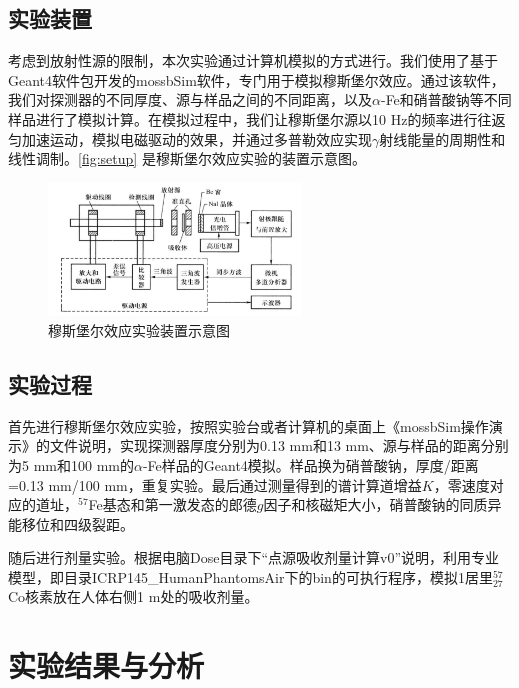 \documentclass[font=default]{mpltx}
\begin{document}
\subsection{实验装置}
考虑到放射性源的限制，本次实验通过计算机模拟的方式进行。我们使用了基于Geant4软件包开发的mossbSim软件，专门用于模拟穆斯堡尔效应。通过该软件，我们对探测器的不同厚度、源与样品之间的不同距离，以及$\alpha$-Fe和硝普酸钠等不同样品进行了模拟计算。在模拟过程中，我们让穆斯堡尔源以10 Hz的频率进行往返匀加速运动，模拟电磁驱动的效果，并通过多普勒效应实现$\gamma$射线能量的周期性和线性调制。\autoref{fig:setup} 是穆斯堡尔效应实验的装置示意图。
\begin{figure}
  \centering
  \includegraphics[width=0.6\textwidth]{fig/setup.png}
  \caption{穆斯堡尔效应实验装置示意图}
  \label{fig:setup}
\end{figure}
\subsection{实验过程}
首先进行穆斯堡尔效应实验，按照实验台或者计算机的桌面上《mossbSim操作演示》的文件说明，实现探测器厚度分别为0.13 mm和13 mm、源与样品的距离分别为5 mm和100 mm的$\alpha$-Fe样品的Geant4模拟。样品换为硝普酸钠，厚度/距离=0.13 mm/100 mm，重复实验。最后通过测量得到的谱计算道增益$K$，零速度对应的道址，$^{57}$Fe基态和第一激发态的郎德$g$因子和核磁矩大小，硝普酸钠的同质异能移位和四级裂距。

随后进行剂量实验。根据电脑Dose目录下“点源吸收剂量计算v0”说明，利用专业模型，即目录ICRP145\_HumanPhantomsAir下的bin的可执行程序，模拟1居里$_{27}^{57}$Co核素放在人体右侧1 m处的吸收剂量。
\section{实验结果与分析}
\end{document}
